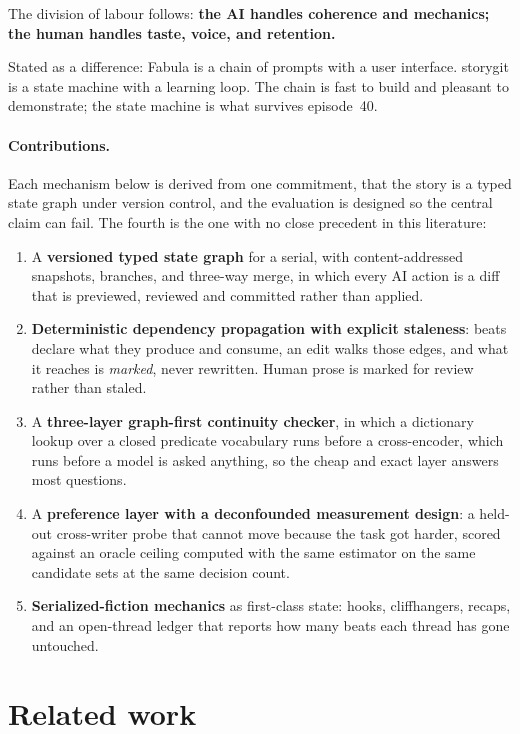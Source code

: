 \documentclass{article}
\newcommand{\storygit}{\textsf{storygit}}
\begin{document}
The division of labour follows: \textbf{the AI handles coherence and mechanics; the human
handles taste, voice, and retention.}

Stated as a difference: Fabula is a chain of prompts with a user interface. \storygit{}
is a state machine with a learning loop. The chain is fast to build and pleasant to
demonstrate; the state machine is what survives episode~40.



\paragraph{Contributions.} Each mechanism below is derived from one commitment, that the
story is a typed state graph under version control, and the evaluation is designed so the
central claim can fail. The fourth is the one with no close precedent in this literature:

\begin{enumerate}[label=(\arabic*)]
\item A \textbf{versioned typed state graph} for a serial, with content-addressed
snapshots, branches, and three-way merge, in which every AI action is a diff that is
previewed, reviewed and committed rather than applied.
\item \textbf{Deterministic dependency propagation with explicit staleness}: beats declare
what they produce and consume, an edit walks those edges, and what it reaches is
\emph{marked}, never rewritten. Human prose is marked for review rather than staled.
\item A \textbf{three-layer graph-first continuity checker}, in which a dictionary lookup
over a closed predicate vocabulary runs before a cross-encoder, which runs before a model
is asked anything, so the cheap and exact layer answers most questions.
\item A \textbf{preference layer with a deconfounded measurement design}: a held-out
cross-writer probe that cannot move because the task got harder, scored against an oracle
ceiling computed with the same estimator on the same candidate sets at the same decision
count.
\item \textbf{Serialized-fiction mechanics} as first-class state: hooks, cliffhangers,
recaps, and an open-thread ledger that reports how many beats each thread has gone
untouched.
\end{enumerate}

\section{Related work}
\label{sec:fabula}
\end{document}
